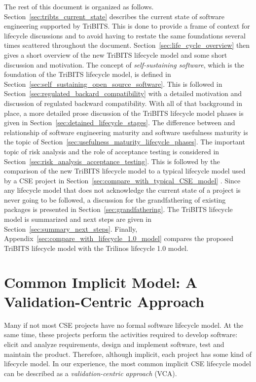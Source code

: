 \documentclass[11pt]{SANDreport}
\begin{document}
The rest of this document is organized as follows.
Section~\ref{sec:tribts_current_state} describes the current state of
software engineering supported by TriBITS.  This is done to provide a
frame of context for lifecycle discussions and to avoid having to
restate the same foundations several times scattered throughout the
document.  Section~\ref{sec:life_cycle_overview} then gives a short
overview of the new TriBITS lifecycle model and some short discussion
and motivation.  The concept of \textit{self-sustaining software},
which is the foundation of the TriBITS lifecycle model, is defined in
Section~\ref{sec:self_sustaining_open_source_software}.  This is
followed in Section~\ref{sec:regulated_backard_compatibility} with a
detailed motivation and discussion of regulated backward
compatibility.  With all of that background in place, a more detailed
prose discussion of the TriBITS lifecycle model phases is given in
Section~\ref{sec:detained_lifecycle_stages}.  The difference between
and relationship of software engineering maturity and software
usefulness maturity is the topic of
Section~\ref{sec:usefulness_maturity_lifecycle_phases}.  The important
topic of risk analysis and the role of acceptance testing is
considered in Section~\ref{sec:risk_analysis_acceptance_testing}.
This is followed by the comparison of the new TriBITS lifecycle model
to a typical lifecycle model used by a CSE project in
Section~\ref{sec:compare_with_typical_CSE_model} .  Since any
lifecycle model that does not acknowledge the current state of a
project is never going to be followed, a discussion for the
grandfathering of existing packages is presented in
Section~\ref{sec:grandfathering}.  The TriBITS lifecycle model is
summarized and next steps are given in
Section~\ref{sec:summary_next_steps}.  Finally,
Appendix~\ref{sec:compare_with_lifecycle_1.0_model} compares the
proposed TriBITS lifecycle model with the Trilinos lifecycle 1.0
model.

%
{}\section {Common Implicit Model: A Validation-Centric Approach}
\label{sec:validation_centric_approach}

Many if not most CSE projects have no formal software lifecycle model.
At the same time, these projects perform the activities required to
develop software: elicit and analyze requirements, design and
implement software, test and maintain the product.  Therefore,
although implicit, each project has some kind of lifecycle model.  In
our experience, the most common implicit CSE lifecycle model can be
described as a \textit{validation-centric approach} (VCA).
\end{document}
